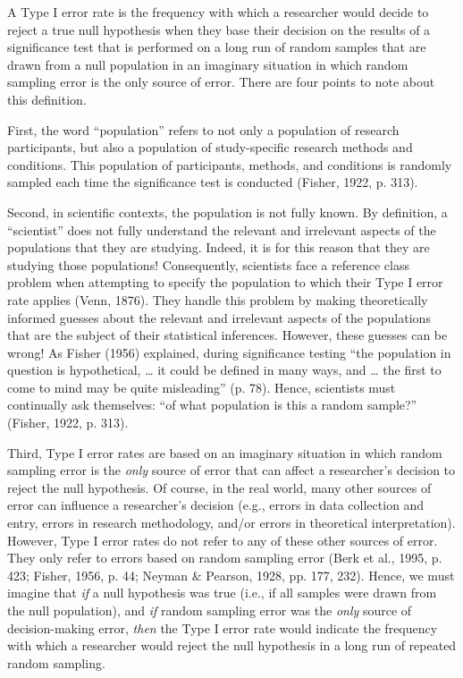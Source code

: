 \documentclass[authordate, empirical]{jote-new-article}
\begin{document}
	A Type I error rate is the frequency with which a researcher would decide to reject a true null hypothesis when they base their decision on the results of a significance test that is performed on a long run of random samples that are drawn from a null population in an imaginary situation in which random sampling error is the only source of error. There are four points to note about this definition.



	First, the word “population” refers to not only a population of research participants, but also a population of study-specific research methods and conditions. This population of participants, methods, and conditions is randomly sampled each time the significance test is conducted (Fisher, 1922, p. 313).



	Second, in scientific contexts, the population is not fully known. By definition, a “scientist” does not fully understand the relevant and irrelevant aspects of the populations that they are studying. Indeed, it is for this reason that they are studying those populations! Consequently, scientists face a reference class problem when attempting to specify the population to which their Type I error rate applies (Venn, 1876). They handle this problem by making theoretically informed guesses about the relevant and irrelevant aspects of the populations that are the subject of their statistical inferences. However, these guesses can be wrong! As Fisher (1956) explained, during significance testing “the population in question is hypothetical, … it could be defined in many ways, and … the first to come to mind may be quite misleading” (p. 78). Hence, scientists must continually ask themselves: “of what population is this a random sample?” (Fisher, 1922, p. 313).



	Third, Type I error rates are based on an imaginary situation in which random sampling error is the \emph{only} source of error that can affect a researcher's decision to reject the null hypothesis. Of course, in the real world, many other sources of error can influence a researcher's decision (e.g., errors in data collection and entry, errors in research methodology, and/or errors in theoretical interpretation). However, Type I error rates do not refer to any of these other sources of error. They only refer to errors based on random sampling error (Berk et al., 1995, p. 423; Fisher, 1956, p. 44; Neyman \& Pearson, 1928, pp. 177, 232). Hence, we must imagine that \emph{if} a null hypothesis was true (i.e., if all samples were drawn from the null population), and \emph{if }random sampling error was the \emph{only} source of decision-making error, \emph{then} the Type I error rate would indicate the frequency with which a researcher would reject the null hypothesis in a long run of repeated random sampling.
\end{document}
